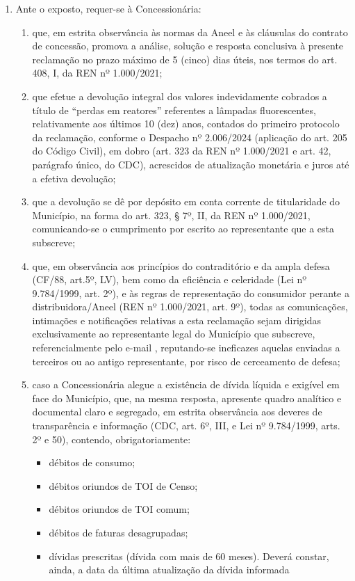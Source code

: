 \begin{enumerate}[resume]

\item
Ante o exposto, requer-se à Concessionária: 

\begin{enumerate}
    \item que, em estrita observância às normas da Aneel e às cláusulas do contrato de concessão, promova a análise, solução e resposta conclusiva à presente reclamação no prazo máximo de 5 (cinco) dias úteis, nos termos do art. 408, I, da REN nº 1.000/2021;
    \item  que efetue a devolução integral dos valores indevidamente cobrados a título de “perdas em reatores” referentes a lâmpadas fluorescentes, relativamente aos últimos 10 (dez) anos, contados do primeiro protocolo da reclamação, conforme o Despacho nº 2.006/2024 (aplicação do art. 205 do Código Civil), em dobro (art. 323 da REN nº 1.000/2021 e art. 42, parágrafo único, do CDC), acrescidos de atualização monetária e juros até a efetiva devolução; 
    \item que a devolução se dê por depósito em conta corrente de titularidade do Município, na forma do art. 323, § 7º, II, da REN nº 1.000/2021, comunicando-se o cumprimento por escrito ao representante que a esta subscreve; 
    \item que, em observância aos princípios do contraditório e da ampla defesa (CF/88, art.5º, LV), bem como da eficiência e celeridade (Lei nº 9.784/1999, art. 2º), e às regras de representação do consumidor perante a distribuidora/Aneel (REN nº 1.000/2021, art. 9º), todas as comunicações, intimações e notificações relativas a esta reclamação sejam dirigidas exclusivamente ao representante legal do Município que subscreve, referencialmente pelo e-mail \emailEmpresa{} , reputando-se ineficazes aquelas enviadas a terceiros ou ao antigo representante, por risco de cerceamento de defesa;
    \item caso a Concessionária alegue a existência de dívida líquida e exigível em face do Município, que, na mesma resposta, apresente quadro analítico e documental claro e segregado, em estrita observância aos deveres de transparência e informação (CDC, art. 6º, III, e Lei nº 9.784/1999, arts. 2º e 50), contendo, obrigatoriamente: 
    \begin{itemize}
        \item débitos de consumo; 
        \item débitos oriundos de TOI de Censo;
        \item débitos oriundos de TOI comum; 
        \item débitos de faturas desagrupadas; 
        \item dívidas prescritas (dívida com mais de 60 meses). Deverá constar, ainda, a data da última atualização da dívida informada 
    \end{itemize}
\end{enumerate}


\end{enumerate}